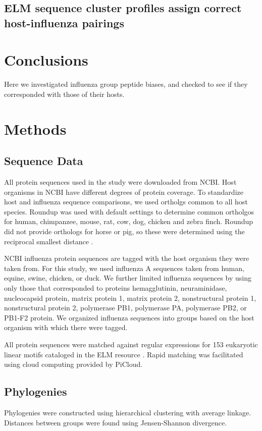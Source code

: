 \documentclass[10pt]{bmc_article}
\newenvironment{bmcformat}{\begin{raggedright}\baselineskip20pt\sloppy\setboolean{publ}{false}}{\end{raggedright}\baselineskip20pt\sloppy}
\begin{document}
\begin{bmcformat}
  \subsection*{ELM sequence cluster profiles assign correct host-influenza pairings}


    

\section*{Conclusions}
Here we investigated influenza group peptide biases, and checked to
see if they corresponded with those of their hosts.
  
\section*{Methods}

\subsection*{Sequence Data}
All protein sequences used in the study were downloaded from
NCBI. Host organisms in NCBI have different degrees of protein
coverage. To standardize host and influenza sequence comparisons, we
used ortholgs common to all host species. Roundup
\cite{deluca2006roundup} was used with default settings to determine
common ortholgos for human, chimpanzee, mouse, rat, cow, dog, chicken
and zebra finch. Roundup did not provide orthologs for horse or pig,
so these were determined using the reciprocal smallest distance
\cite{wall2003detecting}.

NCBI influenza protein sequences are tagged with the host organism
they were taken from. For this study, we used influenza A sequences
taken from human, equine, swine, chicken, or duck. We further limited
influenza sequences by using only those that corresponded to proteins
hemagglutinin, neuraminidase, nucleocapsid protein, matrix protein 1,
matrix protein 2, nonstructural protein 1, nonstructural protein 2,
polymerase PB1, polymerase PA, polymerase PB2, or PB1-F2 protein. We
organized influenza sequences into groups based on the host organism
with which there were tagged.

All protein sequences were matched against regular expressions for 153
eukaryotic linear motifs cataloged in the ELM resource
\cite{gould2010elm}. Rapid matching was facilitated using cloud
computing provided by PiCloud.

\subsection*{Phylogenies}
Phylogenies were constructed using hierarchical clustering with
average linkage. Distances between groups were found using
Jensen-Shannon divergence.


\end{bmcformat}
\end{document}
